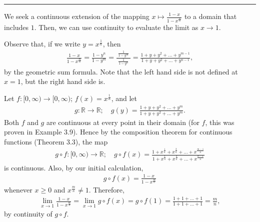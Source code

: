 \documentclass[letterpaper,10pt,english]{jupyterBook}
\begin{document}
\bigskip\hrule\bigskip


\sphinxAtStartPar
{\hyperref[\detokenize{Problems:id33}]{}} We seek a continuous extension of the mapping \(x\mapsto \frac{1-x}{1-x^{\frac{m}{n}}}\) to a domain that includes \(1\). Then, we can use continuity to evaluate the limit as \(x\rightarrow 1\).

Observe that, if we write \(y = x^{\frac{1}{n}}\), then
\begin{equation*}
\begin{split}
\frac{1 - x}{1 - x^{\frac{m}{n}}} = \frac{1 - y^{n}}{1 - y^{m}} = \frac{\;\frac{1}{1-y^m}\;}{\;\frac{1}{1-y^n}\;} = \frac{1+y+y^2+\ldots+y^{m-1}}{1+y+y^2+\ldots+y^{n-1}},
\end{split}
\end{equation*}
\sphinxAtStartPar
by the geometric sum formula. Note that the left hand side is not defined at \(x=1\), but the right hand side is.

Let \(f:[0,\infty)\to[0,\infty)\); \(f(x)=x^{\frac{1}{n}}\), and let
\begin{equation*}
\begin{split}
g:\mathbb{R}\to\mathbb{R};\hspace{1em} g(y)=\frac{1+y+y^2+\ldots+y^m}{1+y+y^2+\ldots+y^m}.
\end{split}
\end{equation*}
\sphinxAtStartPar
Both \(f\) and \(g\) are continuous at every point in their domain (for \(f\), this was proven in Example 3.9). Hence by the composition theorem for continuous functions (Theorem 3.3), the map
\begin{equation*}
\begin{split}
g\circ f:[0,\infty)\to\mathbb{R}; \hspace{1em} g\circ f(x) = \frac{1+x^{\frac{1}{n}}+x^{\frac{2}{n}}+\ldots+x^{\frac{m-1}{n}}}{1+x^{\frac{1}{n}}+x^{\frac{2}{n}}+\ldots+x^{\frac{n-1}{n}}}
\end{split}
\end{equation*}
\sphinxAtStartPar
is continuous. Also, by our initial calculation,
\begin{equation*}
\begin{split}
g\circ f(x) = \frac{1 - x}{1 - x^{\frac{m}{n}}}
\end{split}
\end{equation*}
\sphinxAtStartPar
whenever \(x\geq 0\) and \(x^{\frac{m}{n}}\neq 1\). Therefore,
\begin{equation*}
\begin{split}
\lim_{x\rightarrow 1}\frac{1 - x}{1 - x^{\frac{m}{n}}} = \lim_{x\rightarrow 1}g\circ f(x) = g\circ f(1) = \frac{1+1+\ldots+1}{1+1+\ldots+1} = \frac{m}{n},
\end{split}
\end{equation*}
\sphinxAtStartPar
by continuity of \(g\circ f\).
\end{document}
